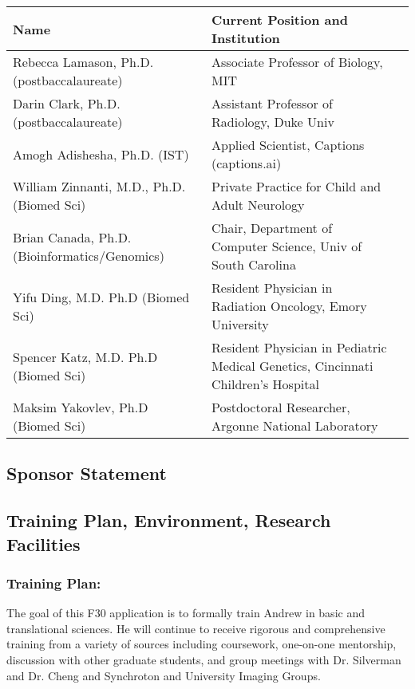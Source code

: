 \documentclass{NIHGrant}
\begin{document}
\begin{center}
\renewcommand{\arraystretch}{1.3}
  \fontsize{9pt}{9pt}\selectfont
  \begin{tabular}{| l | p{3in} | p{5in} |}
    \hline
    \textbf{Name} & \textbf{Current Position and Institution} \\
    \hline
    Rebecca Lamason, Ph.D. (postbaccalaureate) & Associate Professor of Biology, MIT \\
    \hline
    Darin Clark, Ph.D. (postbaccalaureate) & Assistant Professor of Radiology, Duke Univ \\
   \hline
    Amogh Adishesha, Ph.D. (IST)& Applied Scientist, Captions (captions.ai) \\
    \hline
    William Zinnanti, M.D., Ph.D. (Biomed Sci) & Private Practice for Child and Adult Neurology\\
    \hline
    Brian Canada, Ph.D. (Bioinformatics/Genomics) & Chair, Department of Computer Science, Univ of South Carolina \\
    \hline
    Yifu Ding, M.D. Ph.D (Biomed Sci) & Resident Physician in Radiation Oncology, Emory University \\
    \hline 
    Spencer Katz, M.D. Ph.D (Biomed Sci) & Resident Physician in Pediatric Medical Genetics, Cincinnati Children's Hospital \\
    \hline
    Maksim Yakovlev, Ph.D (Biomed Sci) & Postdoctoral Researcher, Argonne National Laboratory \\
    \hline
  \end{tabular}

\end{center}

\subsection*{Sponsor Statement}
\subsection*{Training Plan, Environment, Research Facilities}

\subsubsection*{Training Plan: }
The goal of this F30 application is to formally train Andrew in basic and translational sciences. He will continue to receive rigorous and comprehensive training from a variety of sources including coursework, one-on-one mentorship, discussion with other graduate students, and group meetings with Dr. Silverman and Dr. Cheng and Synchroton and University Imaging Groups.
\end{document}
